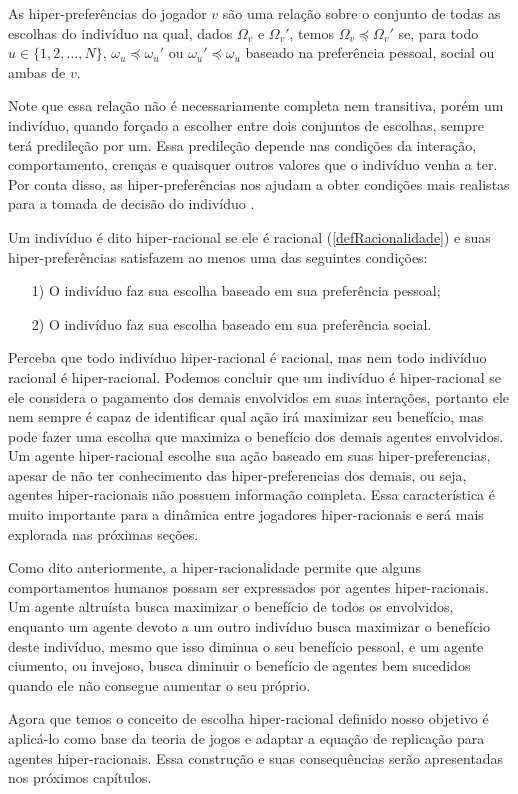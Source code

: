 \begin{definition}
    \label{defHiperPreferencias}
    As hiper-preferências do jogador $v$ são uma relação sobre o conjunto de todas as escolhas do indivíduo na qual, dados $\Omega_v$ e $\Omega_v'$, temos $\Omega_v\preceq\Omega_v'$ se, para todo $u\in\{1,2,\dots,N\}$, $\omega_u\preceq\omega_u'$ ou $\omega_u'\preceq\omega_u$ baseado na preferência pessoal, social ou ambas de $v$.
\end{definition}

Note que essa relação não é necessariamente completa nem transitiva, porém um indivíduo, quando forçado a escolher entre dois conjuntos de escolhas, sempre terá predileção por um. Essa predileção depende nas condições da interação, comportamento, crenças e quaisquer outros valores que o indivíduo venha a ter. Por conta disso, as hiper-preferências nos ajudam a obter condições mais realistas para a tomada de decisão do indivíduo \cite{askari2019behavioral}.

\begin{definition}
    Um indivíduo é dito hiper-racional se ele é racional (\ref{defRacionalidade}) e suas hiper-preferências satisfazem ao menos uma das seguintes condições:
    \begin{itemize}
        \item [1)] O indivíduo faz sua escolha baseado em sua preferência pessoal;
        \item [2)] O indivíduo faz sua escolha baseado em sua preferência social.
    \end{itemize}
\end{definition}

Perceba que todo indivíduo hiper-racional é racional, mas nem todo indivíduo racional é hiper-racional. Podemos concluir que um indivíduo é hiper-racional se ele considera o pagamento dos demais envolvidos em suas interações, portanto ele nem sempre é capaz de identificar qual ação irá maximizar seu benefício, mas pode fazer uma escolha que maximiza o benefício dos demais agentes envolvidos. Um agente hiper-racional escolhe sua ação baseado em suas hiper-preferencias, apesar de não ter conhecimento das hiper-preferencias dos demais, ou seja, agentes hiper-racionais não possuem informação completa. Essa característica é muito importante para a dinâmica entre jogadores hiper-racionais e será mais explorada nas próximas seções.

Como dito anteriormente, a hiper-racionalidade permite que alguns comportamentos humanos possam ser expressados por agentes hiper-racionais. Um agente altruísta busca maximizar o benefício de todos os envolvidos, enquanto um agente devoto a um outro indivíduo busca maximizar o benefício deste indivíduo, mesmo que isso diminua o seu benefício pessoal, e um agente ciumento, ou invejoso, busca diminuir o benefício de agentes bem sucedidos quando ele não consegue aumentar o seu próprio.

Agora que temos o conceito de escolha hiper-racional definido nosso objetivo é aplicá-lo como base da teoria de jogos e adaptar a equação de replicação para agentes hiper-racionais. Essa construção e suas consequências serão apresentadas nos próximos capítulos.
